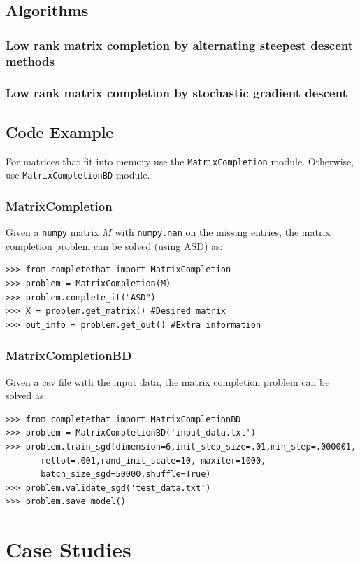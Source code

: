 \documentclass[12pt]{article}
\begin{document}
\subsection*{Algorithms}
\subsubsection*{Low rank matrix completion by alternating steepest descent methods}
\subsubsection*{Low rank matrix completion by stochastic gradient descent}

\subsection*{Code Example}
For matrices that fit into memory use the \texttt{MatrixCompletion} module. Otherwise, use \texttt{MatrixCompletionBD} module. 

\subsubsection*{MatrixCompletion}
Given a \texttt{numpy} matrix $M$ with \texttt{numpy.nan} on the missing entries, the matrix completion problem can be solved (using ASD) as:
\begin{verbatim}
>>> from completethat import MatrixCompletion
>>> problem = MatrixCompletion(M)
>>> problem.complete_it("ASD")
>>> X = problem.get_matrix() #Desired matrix
>>> out_info = problem.get_out() #Extra information
\end{verbatim}

\subsubsection*{MatrixCompletionBD}
Given a csv file with the input data, the matrix completion problem can be solved as:

\begin{verbatim}
>>> from completethat import MatrixCompletionBD
>>> problem = MatrixCompletionBD('input_data.txt')
>>> problem.train_sgd(dimension=6,init_step_size=.01,min_step=.000001, 
       reltol=.001,rand_init_scale=10, maxiter=1000,
       batch_size_sgd=50000,shuffle=True)
>>> problem.validate_sgd('test_data.txt')
>>> problem.save_model()
\end{verbatim}

\section{Case Studies}
\end{document}
